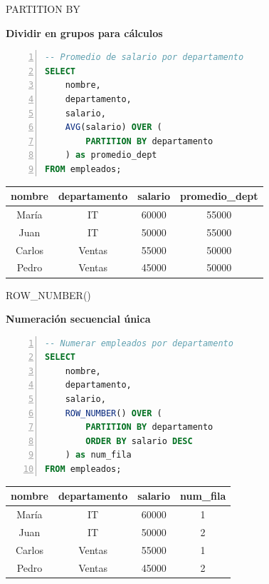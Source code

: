 \documentclass{beamer}
\begin{document}
\begin{frame}[fragile]{PARTITION BY}
    \begin{center}
        \textbf{Dividir en grupos para cálculos}
    \end{center}
    
    \vspace{0.3cm}
    
    \begin{lstlisting}[language=SQL, numbers=left, numbersep=5pt]
-- Promedio de salario por departamento
SELECT 
    nombre,
    departamento,
    salario,
    AVG(salario) OVER (
        PARTITION BY departamento
    ) as promedio_dept
FROM empleados;
    \end{lstlisting}
    
    \vspace{0.3cm}
    
    \begin{center}
        \begin{tabular}{cccc}
            \toprule
            nombre & departamento & salario & promedio\_dept \\
            \midrule
            María & IT & 60000 & 55000 \\
            Juan & IT & 50000 & 55000 \\
            Carlos & Ventas & 55000 & 50000 \\
            Pedro & Ventas & 45000 & 50000 \\
            \bottomrule
        \end{tabular}
    \end{center}
\end{frame}

\begin{frame}[fragile]{ROW\_NUMBER()}
    \begin{center}
        \textbf{Numeración secuencial única}
    \end{center}
    
    \vspace{0.3cm}
    
    \begin{lstlisting}[language=SQL, numbers=left, numbersep=5pt]
-- Numerar empleados por departamento
SELECT 
    nombre,
    departamento,
    salario,
    ROW_NUMBER() OVER (
        PARTITION BY departamento 
        ORDER BY salario DESC
    ) as num_fila
FROM empleados;
    \end{lstlisting}
    
    \begin{center}
        \begin{tabular}{cccc}
            \toprule
            nombre & departamento & salario & num\_fila \\
            \midrule
            María & IT & 60000 & 1 \\
            Juan & IT & 50000 & 2 \\
            Carlos & Ventas & 55000 & 1 \\
            Pedro & Ventas & 45000 & 2 \\
            \bottomrule
        \end{tabular}
    \end{center}
\end{frame}
\end{document}
